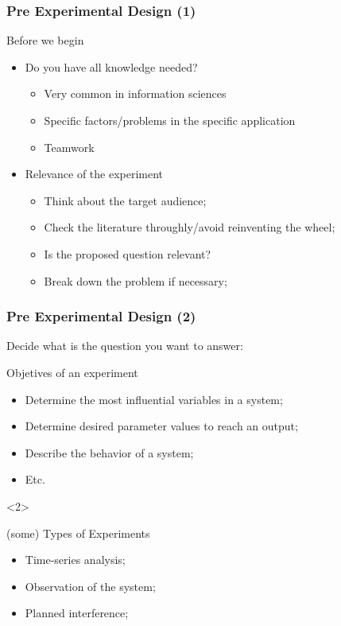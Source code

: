 \documentclass{beamer}
\begin{document}
\begin{frame}
  \frametitle{Pre Experimental Design (1)}
  
  \begin{block}{}
    Before we begin
  \end{block}
  \begin{itemize}
  \item Do you have all knowledge needed?
    \begin{itemize}
    \item Very common in information sciences
    \item Specific factors/problems in the specific application
    \item Teamwork
    \end{itemize}
    \medskip

  \item<2-> Relevance of the experiment
    \begin{itemize}
    \item Think about the target audience;
    \item Check the literature throughly/avoid reinventing the wheel;
    \item Is the proposed question relevant?
    \item Break down the problem if necessary;
    \end{itemize}
  \end{itemize}
\end{frame}

\begin{frame}
  \frametitle{Pre Experimental Design (2)}

  Decide what is the question you want to answer:

  \begin{block}{Objetives of an experiment}
    \begin{itemize}
    \item Determine the most influential variables in a system;
    \item Determine desired parameter values to reach an output;
    \item Describe the behavior of a system;
    \item Etc.
    \end{itemize}
  \end{block}
  \begin{onlyenv}<2>
    \begin{block}{(some) Types of Experiments}
      \begin{itemize}
      \item Time-series analysis;
      \item Observation of the system;
      \item Planned interference;
      \end{itemize}
    \end{block}
  \end{onlyenv}
\end{frame}
\end{document}
